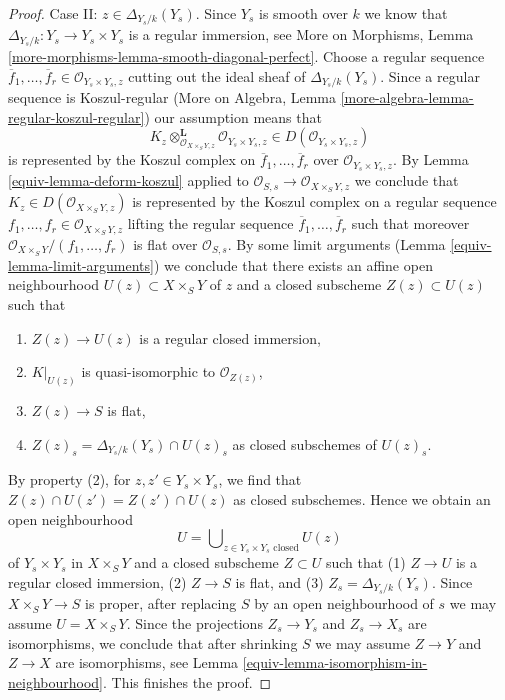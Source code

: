 \begin{proof}
\medskip\noindent
Case II: $z \in \Delta_{Y_s/k}(Y_s)$. Since $Y_s$ is smooth over $k$
we know that $\Delta_{Y_s/k} : Y_s \to Y_s \times Y_s$ is a
regular immersion, see More on Morphisms, Lemma
\ref{more-morphisms-lemma-smooth-diagonal-perfect}.
Choose a regular sequence $\overline{f}_1, \ldots, \overline{f}_r \in
\mathcal{O}_{Y_s \times Y_s, z}$ cutting out the ideal sheaf of
$\Delta_{Y_s/k}(Y_s)$. Since a regular sequence is Koszul-regular
(More on Algebra, Lemma \ref{more-algebra-lemma-regular-koszul-regular})
our assumption means that
$$
K_z \otimes_{\mathcal{O}_{X \times_S Y, z}}^\mathbf{L}
\mathcal{O}_{Y_s \times Y_s, z}
\in D(\mathcal{O}_{Y_s \times Y_s, z})
$$
is represented by the Koszul complex on
$\overline{f}_1, \ldots, \overline{f}_r$ over
$\mathcal{O}_{Y_s \times Y_s, z}$.
By Lemma \ref{equiv-lemma-deform-koszul} applied to
$\mathcal{O}_{S, s} \to \mathcal{O}_{X \times_S Y, z}$
we conclude that $K_z \in D(\mathcal{O}_{X \times_S Y, z})$ is
represented by the Koszul complex on a regular sequence
$f_1, \ldots, f_r \in \mathcal{O}_{X \times_S Y, z}$
lifting the regular sequence
$\overline{f}_1, \ldots, \overline{f}_r$
such that moreover $\mathcal{O}_{X \times_S Y}/(f_1, \ldots, f_r)$
is flat over $\mathcal{O}_{S, s}$.
By some limit arguments (Lemma \ref{equiv-lemma-limit-arguments})
we conclude that there exists an affine open neighbourhood
$U(z) \subset X \times_S Y$ of $z$ and a closed subscheme
$Z(z) \subset U(z)$ such that
\begin{enumerate}
\item $Z(z) \to U(z)$ is a regular closed immersion,
\item $K|_{U(z)}$ is quasi-isomorphic to $\mathcal{O}_{Z(z)}$,
\item $Z(z) \to S$ is flat,
\item $Z(z)_s = \Delta_{Y_s/k}(Y_s) \cap U(z)_s$
as closed subschemes of $U(z)_s$.
\end{enumerate}

By property (2), for $z, z' \in Y_s \times Y_s$, we
find that $Z(z) \cap U(z') = Z(z') \cap U(z)$ as closed subschemes.
Hence we obtain an open neighbourhood
$$
U = \bigcup\nolimits_{z \in Y_s \times Y_s\text{ closed}} U(z)
$$
of $Y_s \times Y_s$ in $X \times_S Y$ and a closed subscheme $Z \subset U$
such that (1) $Z \to U$ is a regular closed immersion,
(2) $Z \to S$ is flat, and (3) $Z_s = \Delta_{Y_s/k}(Y_s)$.
Since $X \times_S Y \to S$ is proper, after replacing $S$
by an open neighbourhood of $s$ we may assume $U = X \times_S Y$.
Since the projections $Z_s \to Y_s$ and $Z_s \to X_s$
are isomorphisms, we conclude that after shrinking $S$
we may assume $Z \to Y$ and $Z \to X$ are isomorphisms, see
Lemma \ref{equiv-lemma-isomorphism-in-neighbourhood}.
This finishes the proof.
\end{proof}

